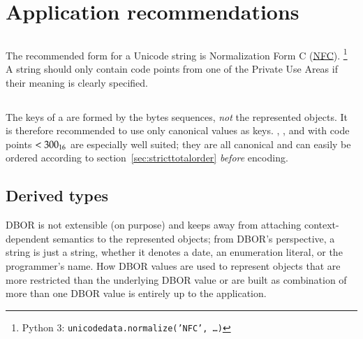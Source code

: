 
\section{Application recommendations}
\label{sec:applicationrecommendations}

\subsection{\DborUtfEightStringValue}

The recommended form for a Unicode string is
Normalization Form C (\href{https://www.unicode.org/versions/Unicode13.0.0/ch03.pdf\#G31703}{NFC}).%
\footnote{
    Python 3: \texttt{unicodedata.normalize('NFC', \dots)}
}
A string should only contain code points from one of the Private Use Areas if their meaning is clearly specified.


\subsection{\DborDictionaryValue}

The keys of a \DborDictionaryValue{} are formed by the bytes sequences, \emph{not} the represented objects.
It is therefore recommended to use only canonical values as keys.
\DborIntegerValue{}, \DborByteStringValue{}, and \DborUtfEightStringValue{} with code points $< \mathrm{300}_{16}$
are especially well suited; they are all canonical and can easily be ordered according to
section~\ref{sec:stricttotalorder} \emph{before} encoding.


\subsection{Derived types}

DBOR is not extensible (on purpose) and keeps away from attaching context-dependent semantics to the represented objects;
from DBOR's perspective, a string is just a string, whether it denotes a date, an enumeration literal,
or the programmer's name.
How DBOR values are used to represent objects that
are more restricted than the underlying DBOR value or
are built as combination of more than one DBOR value
is entirely up to the application.

